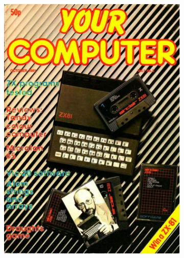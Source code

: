 \begin{frame}{}
    \begin{figure}
    \centering
        \begin{subfigure}{.5\textwidth}
          \centering
          \includegraphics[width=\linewidth]{images/YourComputer_1981_10}
        \end{subfigure}%
        \begin{subfigure}{.5\textwidth}
          \centering

\end{subfigure}
\end{figure}
\end{frame}
